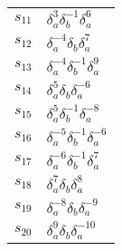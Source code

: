 \documentclass{article}
\begin{document}
\begin{center}
\begin{tabular}{ll}
$s_{11}$ & $\delta_a^{3}\delta_b^{-1}\delta_a^{6}$ \\
$s_{12}$ & $\delta_a^{-4}\delta_b^{}\delta_a^{7}$ \\
$s_{13}$ & $\delta_a^{-4}\delta_b^{-1}\delta_a^{9}$ \\
$s_{14}$ & $\delta_a^{5}\delta_b^{}\delta_a^{-6}$ \\
$s_{15}$ & $\delta_a^{5}\delta_b^{-1}\delta_a^{-8}$ \\
$s_{16}$ & $\delta_a^{-5}\delta_b^{-1}\delta_a^{-6}$ \\
$s_{17}$ & $\delta_a^{-6}\delta_b^{-1}\delta_a^{7}$ \\
$s_{18}$ & $\delta_a^{7}\delta_b^{}\delta_a^{8}$ \\
$s_{19}$ & $\delta_a^{-8}\delta_b^{}\delta_a^{-9}$ \\
$s_{20}$ & $\delta_a^{9}\delta_b^{}\delta_a^{-10}$ \\
\bottomrule
\end{tabular}
\end{center}

\thispagestyle{empty}
\end{document}
